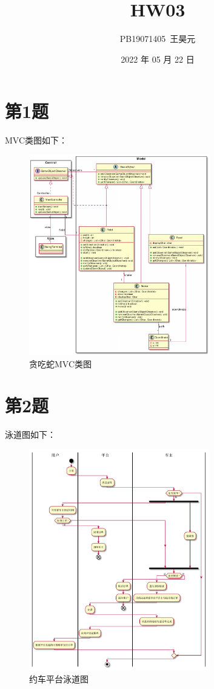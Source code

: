 \documentclass{article}
\title{HW03}
\author{PB19071405\ 王昊元}
\date{2022 年 05 月 22 日}
\begin{document}
    \maketitle

    \section*{第1题}
    MVC类图如下：
    \begin{figure}[H]
        \centering
        \includegraphics[width=0.7\textwidth]{./fig/hw03/1.pdf}
        \caption{贪吃蛇MVC类图}
    \end{figure}
    \section*{第2题}
    泳道图如下：
    \begin{figure}[H]
        \centering
        \includegraphics[width=0.7\textwidth]{./fig/hw03/2.pdf}
        \caption{约车平台泳道图}
    \end{figure}
\end{document}
